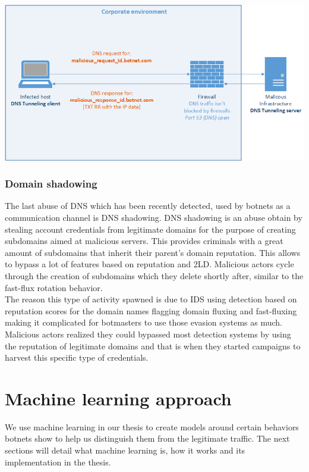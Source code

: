 \includegraphics[scale=.8]{img/pers_tunn.png}


\subsubsection{Domain shadowing}
The last abuse of DNS which has been recently detected, used by botnets as a communication channel is DNS shadowing. DNS shadowing is an abuse obtain by stealing account credentials from legitimate domains for the purpose of creating subdomains aimed at malicious servers. This provides criminals with a great amount of subdomains that inherit their parent's domain reputation. This allows to bypass a lot of features based on reputation and 2LD.
Malicious actors cycle through the creation of subdomains which they delete shortly after, similar to the fast-flux rotation behavior.
\\
The reason this type of activity spawned is due to IDS using detection based on reputation scores for the domain names flagging domain fluxing and fast-fluxing making it complicated for botmasters to use those evasion systems as much. Malicious actors realized they could bypassed most detection systems by using the reputation of legitimate domains and that is when they started campaigns to harvest this specific type of credentials.

\cite{review2}\cite{detection8}

\cite{shadowing2}
\cite{shadowing3}
\cite{shadowing4}
\cite{shadowing5}

\section{Machine learning approach}
We use machine learning in our thesis to create models around certain behaviors botnets show to help us distinguish them from the legitimate traffic. The next sections will detail what machine learning is, how it works and its implementation in the thesis.

